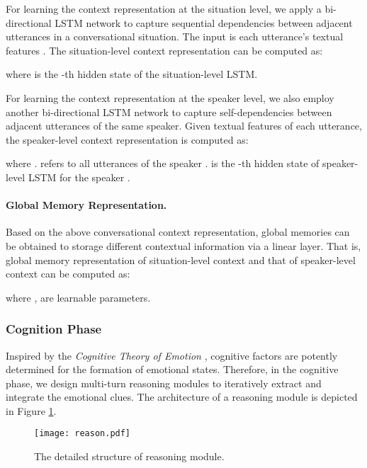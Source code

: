\documentclass[11pt,a4paper]{article}
\begin{document}
For learning the context representation at the situation level, we apply a bi-directional LSTM network to capture sequential dependencies between adjacent utterances in a conversational situation.
The input is each utterance's textual features . 
The situation-level context representation  can be computed as:
 
where 
 is the -th hidden state of the situation-level LSTM. 


For learning the context representation at the speaker level, we also employ another bi-directional LSTM network to capture self-dependencies between adjacent utterances of the same speaker. 
Given textual features  of each utterance, the speaker-level context representation  is computed as:
 
where .  
 refers to all utterances of the speaker .  is the -th hidden state of speaker-level LSTM for the speaker .
  


\paragraph{Global Memory Representation.}
Based on the above conversational context representation, global memories can be obtained to storage different contextual information via a linear layer.
That is, global memory representation of situation-level context  and that of speaker-level context  can be computed as:

where ,  are learnable parameters. 



\subsubsection{Cognition Phase} \label{sec:cog}

Inspired by the \textit{Cognitive Theory of Emotion} \cite{article1962,scherer2001appraisal}, cognitive factors are potently determined for the formation of emotional states.
Therefore, in the cognitive phase, we design multi-turn reasoning modules to iteratively extract and integrate the emotional clues.
The architecture of a reasoning module is depicted in Figure \ref{fig:reason}.

\begin{figure}[t]
  \centering
  \texttt{[image: reason.pdf]}
  \caption{The detailed structure of reasoning module. }
  \label{fig:reason}
\end{figure}
\end{document}
